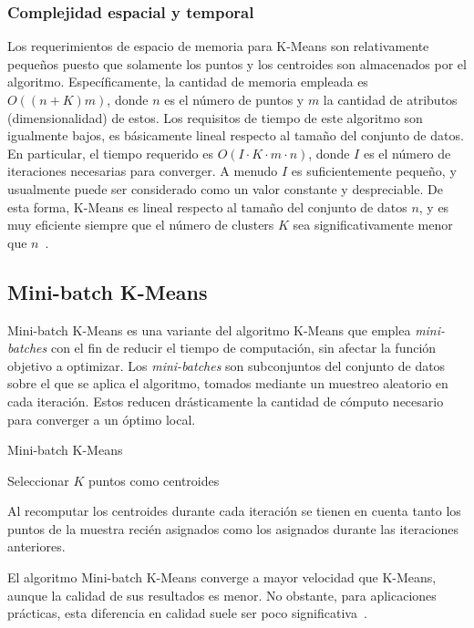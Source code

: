 \subsubsection{Complejidad espacial y temporal}

Los requerimientos de espacio de memoria para K-Means son relativamente pequeños puesto que solamente los puntos y los centroides son almacenados por el algoritmo.
Específicamente, la cantidad de memoria empleada es $O((n+K)m)$, donde $n$ es el número de puntos y $m$ la cantidad de atributos (dimensionalidad) de estos.
Los requisitos de tiempo de este algoritmo son igualmente bajos, es básicamente lineal respecto al tamaño del conjunto de datos.
En particular, el tiempo requerido es $O(I \cdot K \cdot m \cdot n)$, donde $I$ es el número de iteraciones necesarias para converger.
A menudo $I$ es suficientemente pequeño, y usualmente puede ser considerado como un valor constante y despreciable.
De esta forma, K-Means es lineal respecto al tamaño del conjunto de datos $n$, y es muy eficiente siempre que el número de clusters $K$ sea significativamente menor que $n$~\cite{Tan05}.

\subsection{Mini-batch K-Means}\label{subsec:miniBatchKMeans}

Mini-batch K-Means es una variante del algoritmo K-Means que emplea \textit{mini-batches} con el fin de reducir el tiempo de computación, sin afectar la función objetivo a optimizar.
Los \textit{mini-batches} son subconjuntos del conjunto de datos sobre el que se aplica el algoritmo, tomados mediante un muestreo aleatorio en cada iteración.
Estos reducen drásticamente la cantidad de cómputo necesario para converger a un óptimo local.

\begin{algorithm}
    \caption{Mini-batch K-Means}
    \label{algorithm:MiniBatchKMeans}
    Seleccionar $K$ puntos como centroides\;
\end{algorithm}

Al recomputar los centroides durante cada iteración se tienen en cuenta tanto los puntos de la muestra recién asignados como los asignados durante las iteraciones anteriores.

El algoritmo Mini-batch K-Means converge a mayor velocidad que K-Means, aunque la calidad de sus resultados es menor.
No obstante, para aplicaciones prácticas, esta diferencia en calidad suele ser poco significativa~\cite{Sculley10}.